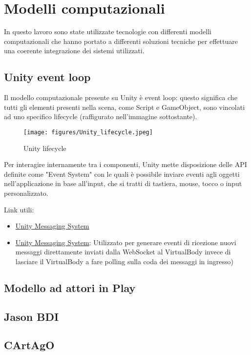 \section{Modelli computazionali}

In questo lavoro sono state utilizzate tecnologie con differenti modelli computazionali che
hanno portato a differenti soluzioni tecniche per effettuare una coerente integrazione dei sistemi utilizzati.
\subsection{Unity event loop}

Il modello computazionale presente su Unity è event loop: questo significa che tutti gli elementi presenti nella scena, come Script e GameObject, sono vincolati ad uno specifico lifecycle (raffigurato nell'immagine sottostante).
\begin{figure}[H]
   \centering
   \texttt{[image: figures/Unity\_lifecycle.jpeg]}
   \caption{Unity lifecycle\cite{unity}}
\end{figure}


Per interagire internamente tra i componenti, Unity mette disposizione delle API definite come "Event System"
con le quali è possibile inviare eventi agli oggetti nell'applicazione in base all'input, che si tratti di tastiera, mouse, tocco o input personalizzato.

Link utili:
\begin{itemize}
   \item \href{https://docs.unity3d.com/2018.3/Documentation/Manual/MessagingSystem.html}{Unity Messaging System}
   \item \href{https://docs.unity3d.com/2018.3/Documentation/Manual/MessagingSystem.html}{Unity Messaging System}: Utilizzato per generare eventi di ricezione nuovi messaggi direttamente inviati dalla WebSocket al VirtualBody invece di lasciare il VirtualBody a fare polling sulla coda dei messaggi in ingresso)
\end{itemize}

\subsection{Modello ad attori in Play}

\subsection{Jason BDI}

\subsection{CArtAgO}
